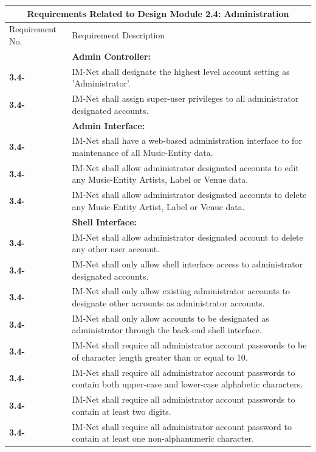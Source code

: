 \documentclass[letterpaper,12pt]{article}
\newcounter{rcounter}							%
\newcommand\rnumber{\stepcounter{rcounter}\arabic{rcounter}}
\begin{document}
{\begin{center}
\begin{tabular}{|l|p{6in}|}
\end{tabular} 
\end{center}

\setcounter{rcounter}{0}
\begin{center}
\begin{tabular}{|l|p{6in}|}
\hline 
\multicolumn{2}{|c|}{\textbf{Requirements Related to Design Module 2.4: Administration}} \\ 
\hline 
Requirement No. & Requirement Description \\ 
\hline
& \textbf{Admin Controller:} \\
\hline
\textbf{3.4-\rnumber} & IM-Net shall designate the highest level account setting as 'Administrator'. \\ 
\hline
\textbf{3.4-\rnumber} & IM-Net shall assign super-user privileges to all administrator designated accounts. \\ 
\hline 
& \textbf{Admin Interface:} \\
\hline
\textbf{3.4-\rnumber} & IM-Net shall have a web-based administration interface to for maintenance of all Music-Entity data. \\ 
\hline 
\textbf{3.4-\rnumber} & IM-Net shall allow administrator designated accounts to edit any Music-Entity Artists, Label or Venue data. \\ 
\hline 
\textbf{3.4-\rnumber} & IM-Net shall allow administrator designated accounts to delete any Music-Entity Artist, Label or Venue data. \\ 
\hline 
& \textbf{Shell Interface:} \\
\hline
\textbf{3.4-\rnumber} & IM-Net shall allow administrator designated account to delete any other user account. \\ 
\hline
\textbf{3.4-\rnumber} & IM-Net shall only allow shell interface access to administrator designated accounts. \\ 
\hline 
\textbf{3.4-\rnumber} & IM-Net shall only allow existing administrator accounts to designate other accounts as administrator accounts. \\
\hline 
\textbf{3.4-\rnumber} & IM-Net shall only allow accounts to be designated as administrator through the back-end shell interface. \\ 
\hline 
\textbf{3.4-\rnumber} & IM-Net shall require all administrator account passwords to be of character length greater than or equal to 10.  \\ 
\hline 
\textbf{3.4-\rnumber} & IM-Net shall require all administrator account passwords to contain both upper-case and lower-case alphabetic characters. \\
\hline 
\textbf{3.4-\rnumber} & IM-Net shall require all administrator account passwords to contain at least two digits. \\ 
\hline 
\textbf{3.4-\rnumber} & IM-Net shall require all administrator account password to contain at least one non-alphanumeric character. \\ 
\hline 



\end{tabular}
\end{center}}
\end{document}
